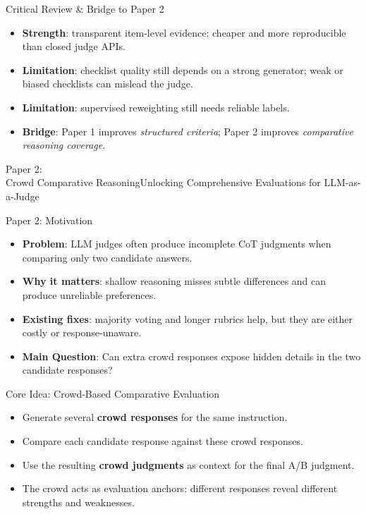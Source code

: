 \documentclass[10pt]{beamer}
\begin{document}
\begin{frame}{Critical Review \& Bridge to Paper 2}
  \begin{itemize}
    \item \textbf{Strength}: transparent item-level evidence; cheaper and more reproducible than closed judge APIs.
    \item \textbf{Limitation}: checklist quality still depends on a strong generator; weak or biased checklists can mislead the judge.
    \item \textbf{Limitation}: supervised reweighting still needs reliable labels.
    \item \textbf{Bridge}: Paper 1 improves \emph{structured criteria}; Paper 2 improves \emph{comparative reasoning coverage}.
  \end{itemize}
\end{frame}


\begin{frame}[standout]
  \hypertarget{paper2}{}
  \Large Paper 2:\\Crowd Comparative Reasoning\newline Unlocking Comprehensive Evaluations for LLM-as-a-Judge
\end{frame}

\begin{frame}{Paper 2: Motivation}
  \begin{itemize}
    \item \textbf{Problem}: LLM judges often produce incomplete CoT judgments when comparing only two candidate answers.
    \item \textbf{Why it matters}: shallow reasoning misses subtle differences and can produce unreliable preferences.
    \item \textbf{Existing fixes}: majority voting and longer rubrics help, but they are either costly or response-unaware.
    \item \textbf{Main Question}: Can extra crowd responses expose hidden details in the two candidate responses?
  \end{itemize}
\end{frame}

\begin{frame}{Core Idea: Crowd-Based Comparative Evaluation}
  \begin{itemize}
    \item Generate several \textbf{crowd responses} for the same instruction.
    \item Compare each candidate response against these crowd responses.
    \item Use the resulting \textbf{crowd judgments} as context for the final A/B judgment.
    \item The crowd acts as evaluation anchors: different responses reveal different strengths and weaknesses.
  \end{itemize}
\end{frame}
\end{document}
